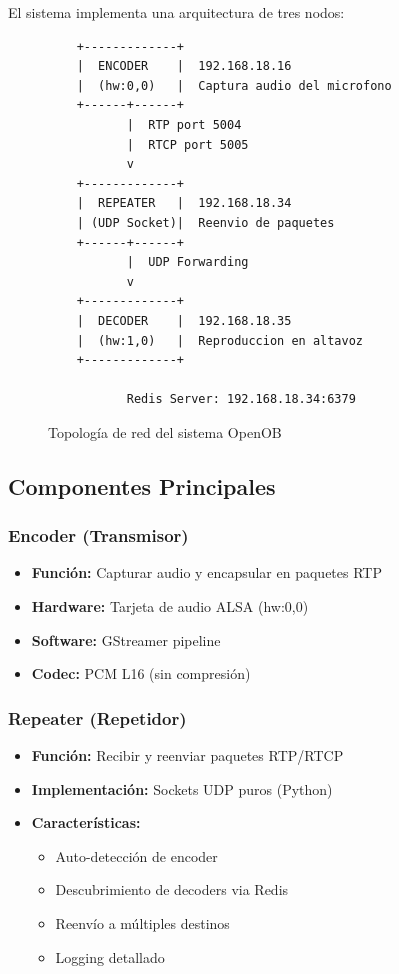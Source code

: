 \documentclass[12pt,a4paper]{article}
\begin{document}
El sistema implementa una arquitectura de tres nodos:

\begin{figure}[H]
    \centering
    \begin{verbatim}
    +-------------+
    |  ENCODER    |  192.168.18.16
    |  (hw:0,0)   |  Captura audio del microfono
    +------+------+
           |  RTP port 5004
           |  RTCP port 5005
           v
    +-------------+
    |  REPEATER   |  192.168.18.34
    | (UDP Socket)|  Reenvio de paquetes
    +------+------+
           |  UDP Forwarding
           v
    +-------------+
    |  DECODER    |  192.168.18.35
    |  (hw:1,0)   |  Reproduccion en altavoz
    +-------------+
    
           Redis Server: 192.168.18.34:6379
    \end{verbatim}
    \caption{Topología de red del sistema OpenOB}
    \label{fig:topology}
\end{figure}

\subsection{Componentes Principales}

\subsubsection{Encoder (Transmisor)}

\begin{itemize}
    \item \textbf{Función:} Capturar audio y encapsular en paquetes RTP
    \item \textbf{Hardware:} Tarjeta de audio ALSA (hw:0,0)
    \item \textbf{Software:} GStreamer pipeline
    \item \textbf{Codec:} PCM L16 (sin compresión)
\end{itemize}

\subsubsection{Repeater (Repetidor)}

\begin{itemize}
    \item \textbf{Función:} Recibir y reenviar paquetes RTP/RTCP
    \item \textbf{Implementación:} Sockets UDP puros (Python)
    \item \textbf{Características:}
    \begin{itemize}
        \item Auto-detección de encoder
        \item Descubrimiento de decoders via Redis
        \item Reenvío a múltiples destinos
        \item Logging detallado
    \end{itemize}
\end{itemize}
\end{document}
